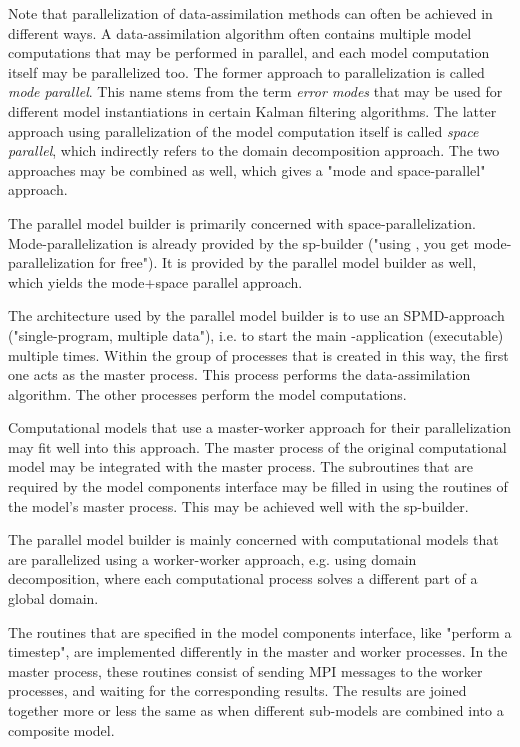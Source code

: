 Note that parallelization of data-assimilation methods can often be achieved in different ways. A data-assimilation algorithm often contains multiple model computations that may be performed in parallel, and each model computation itself may be parallelized too. The former approach to parallelization is called \emph{mode parallel}. This name stems from the term \emph{error modes} that may be used for different model instantiations in certain Kalman filtering algorithms. The latter approach using parallelization of the model computation itself is called \emph{space parallel}, which indirectly refers to the domain decomposition approach. The two approaches may be combined as well, which gives a "mode and space-parallel" approach.

The parallel model builder is primarily concerned with space-parallelization. Mode-parallelization is already provided by the sp-builder ("using \oda, you get mode-parallelization for free"). It is provided by the parallel model builder as well, which yields the mode+space parallel approach.

The architecture used by the parallel model builder is to use an SPMD-approach ("single-program, multiple data"), i.e. to start the main \oda-application (executable) multiple times. Within the group of processes that is created in this way, the first one acts as the master process. This process performs the data-assimilation algorithm. The other processes perform the model computations.

Computational models that use a master-worker approach for their parallelization may fit well into this approach. The master process of the original computational model may be integrated with the \oda master process. The subroutines that are required by the \oda model components interface may be filled in using the routines of the model's master process. This may be achieved well with the sp-builder.

The parallel model builder is mainly concerned with computational models that are parallelized using a worker-worker approach, e.g. using domain decomposition, where each computational process solves a different part of a global domain.

The routines that are specified in the \oda model components interface, like "perform a timestep", are implemented differently in the master and worker processes. In the master process, these routines consist of sending MPI messages to the worker processes, and waiting for the corresponding results. The results are joined together more or less the same as when different sub-models are combined into a composite model.

